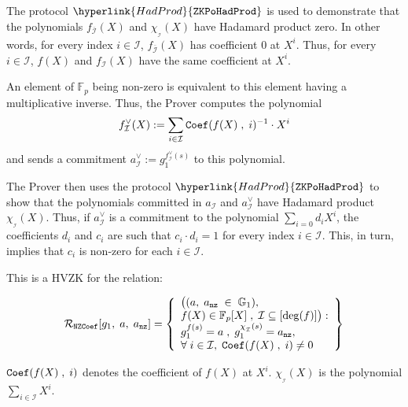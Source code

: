 \documentclass[11pt, lettersize, notitlepage, leqno, footskip=0.6cm]{article}
\newcommand{\bFp}{\mathbb{F}_p}
\newcommand{\mc}{\mathcal}
\newcommand{\mb}{\mathbb}
\newcommand{\ov}{\overline}
\newcommand{\sub}{\subseteq}
\newcommand{\vs}{\vspace{-0.15cm}}
\newcommand{\noin}{\noindent}
\numberwithin{equation}{section}
\begin{document}
The protocol $\hyperlink{HadProd}{\tt{ZKPoHadProd}}$ is used to demonstrate that the polynomials $f_{\ov{\mc{I}}}(X)$ and $\chi_{_\mc{I}}(X)$ have Hadamard product zero. In other words, for every index $i\in \mc{I}$, $f_{\ov{\mc{I}}}(X)$ has coefficient $0$ at $X^i$. Thus, for every $i\in \mc{I}$, $f(X)$ and $f_{{\mc{I}}}(X)$ have the same coefficient at $X^i.$

An element of $\bFp$ being non-zero is equivalent to this element having a multiplicative inverse. Thus, the Prover computes the polynomial \vs $$f_\mc{I}^{\vee}(X):=\sum\limits_{i\in \mc{I}} {\tt{Coef}}(f(X)\;,\;i)^{-1} \cdot X^{i}   \vs  $$ and sends a commitment $a_\mc{I}^{\vee}:= g_1^{f_\mc{I}^{\vee}(s)}$ to this polynomial.

The Prover then uses the protocol $\hyperlink{HadProd}{\tt{ZKPoHadProd}}$ to show that the polynomials committed in $a_\mc{I}$ and $a_\mc{I}^{\vee}$ have Hadamard product $\chi_{_\mc{I}}(X)$. Thus, if $a_\mc{I}^{\vee}$ is a commitment to the polynomial $\sum_{i=0} d_i X^i$, the coefficients $d_i$ and $c_i$ are such that $c_i\cdot d_i = 1$ for every index $i\in \mc{I}$. This, in turn, implies that $c_i$ is non-zero for each $i\in \mc{I}$.




This is a HVZK for the relation: \vspace{-2mm}

$$\mc{R}_{\tt{NZCoef}}[g_1,\;a,\;a_{\tt{nz}}] = \left\{\begin{array}{l} \big((a,\;a_{\tt{nz}}\;\in\;\mb{G}_1),\\
f(X)\in \bFp[X]\;,\; \mc{I}\sub [ \deg(f)]\big):\\
g_1^{f(s)} = a\;,\;g_1^{\chi_{_\mc{I}}(s)} =a_{\tt{nz}},\\
\forall\;i\in \mc{I},\; {\tt{Coef}}(f(X)\;,\; i)\neq 0 \end{array}\right\}  $$

\noin ${\tt{Coef}}(f(X)\;,\; i)$ denotes the coefficient of $f(X)$ at $X^i$. $\chi_{_\mc{I}}(X)$ is the polynomial $\sum\limits_{i\in \mc{I}} X^i$.
 







\vspace{2mm}
\end{document}
